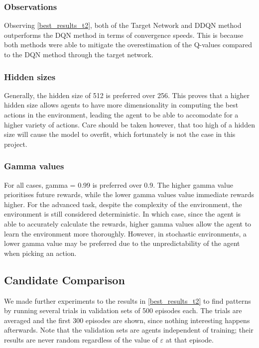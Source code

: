 \subsubsection{Observations}
Observing \cref{best_results_t2}, both of the Target Network and DDQN method outperforms the DQN method in terms of convergence speeds. This is because both methods were able to mitigate the overestimation of the Q-values compared to the DQN method through the target network.

\subsubsection{Hidden sizes}
Generally, the hidden size of 512 is preferred over 256. This proves that a higher hidden size allows agents to have more dimensionality in computing the best actions in the environment, leading the agent to be able to accomodate for a higher variety of actions. Care should be taken however, that too high of a hidden size will cause the model to overfit, which fortunately is not the case in this project.

\subsubsection{Gamma values}
For all cases, gamma = 0.99 is preferred over 0.9. The higher gamma value prioritises future rewards, while the lower gamma values value immediate rewards higher. For the advanced task, despite the complexity of the environment, the environment is still considered deterministic. In which case, since the agent is able to accurately calculate the rewards, higher gamma values allow the agent to learn the environment more thoroughly. However, in stochastic environments, a lower gamma value may be preferred due to the unpredictability of the agent when picking an action.

\subsection{Candidate Comparison}
\label{candidate_comparison}

We made further experiments to the results in \cref{best_results_t2} to find patterns by running several trials in validation sets of 500 episodes each.
The trials are averaged and the first 300 episodes are shown, since nothing interesting happens afterwards.
Note that the validation sets are agents independent of training; their results are never random regardless of the value of $\varepsilon$ at that episode.

